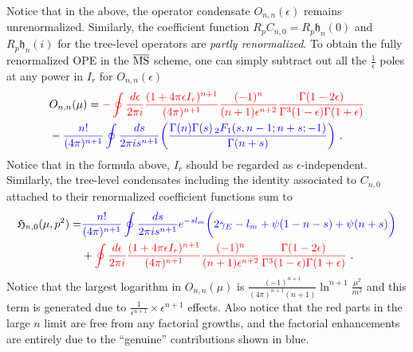 \documentclass[a4paper,11pt]{article}
\begin{document}
Notice that in the above, the operator condensate $O_{n,n}(\epsilon)$ remains unrenormalized. Similarly, the coefficient function $R_pC_{n,0}=R_p\mathfrak{h}_n(0)$ and $R_p\mathfrak{h}_n(i)$ for the tree-level operators are {\it partly renormalized}.  To obtain the fully renormalized OPE in the $\overline{\rm MS}$ scheme, one can simply subtract out all the $\frac{1}{\epsilon}$ poles at any power in $I_r$ for $O_{n,n}(\epsilon)$
\begin{align}
&O_{n,n}(\mu)={\color{red}-\oint\frac{d\epsilon}{2\pi i}\frac{(1+4\pi\epsilon I_r)^{n+1}}{(4\pi)^{n+1}}\frac{(-1)^n}{(n+1)\epsilon^{n+2}}\frac{\Gamma(1-2\epsilon)}{\Gamma^3(1-\epsilon)\Gamma(1+\epsilon)}} \nonumber \\ 
&-{\color{blue}\frac{n!}{(4\pi)^{n+1}}\oint\frac{ds }{2\pi i s^{n+1}}\bigg(\frac{\Gamma (n) \Gamma (s) \, _2{F}_1(s,n-1;n+s;-1)}{\Gamma(n+s)}\bigg) }\ .
\end{align} 
Notice that in the formula above, $I_r$ should be regarded as $\epsilon$-independent. 
Similarly, the tree-level condensates including the identity associated to $C_{n,0}$ attached to their renormalized coefficient functions sum to
\begin{align}
\mathfrak{H}_{n,0}(\mu,p^2)=& {\color{blue}\frac{n!}{(4\pi)^{n+1}}\oint\frac{ds }{2\pi i s^{n+1}}e^{-sl_{m}}\bigg(2\gamma_E-l_{m}+\psi(1-n-s)+\psi(n+s)\bigg)}\\ 
&+{\color{red}\oint\frac{d\epsilon}{2\pi i}\frac{(1+4\pi\epsilon I_r)^{n+1}}{(4\pi)^{n+1}}\frac{(-1)^n}{(n+1)\epsilon^{n+2}}\frac{\Gamma(1-2\epsilon)}{\Gamma^3(1-\epsilon)\Gamma(1+\epsilon)}} \ .
\end{align}
Notice that the largest logarithm in $O_{n,n}(\mu)$ is $\frac{(-1)^{n+1}}{(4\pi)^{n+1}(n+1)}\ln^{n+1}\frac{\mu^2}{m^2}$ and this term is generated due to $\frac{1}{\epsilon^{n+1}}\times \epsilon^{n+1}$ effects. Also notice that the red parts in the large $n$ limit are free from any factorial growths, and the factorial enhancements are entirely due to the ``genuine'' contributions shown in blue.
\end{document}

